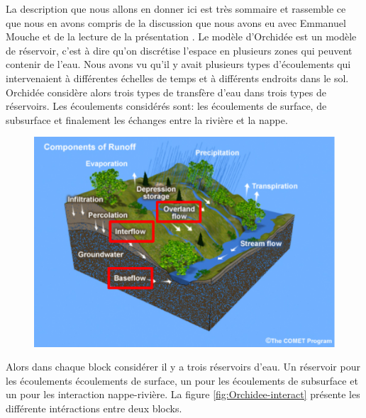 \documentclass[a4paper,11pt]{article}
\numberwithin{equation}{section}
\begin{document}
La description que nous allons en donner ici est très sommaire et rassemble ce que nous en avons compris de la discussion que nous avons eu avec Emmanuel Mouche et de la lecture de la présentation \cite{gumiberteau2016}. Le modèle d'Orchidée est un modèle de réservoir, c'est à dire qu'on discrétise l'espace en plusieurs zones qui peuvent contenir de l'eau. Nous avons vu qu'il y avait plusieurs types d'écoulements qui intervenaient à différentes échelles de temps et à différents endroits dans le sol. Orchidée considère alors trois types de transfère d'eau dans trois types de réservoirs. Les écoulements considérés sont: les écoulements de surface, de subsurface et finalement les échanges entre la rivière et la nappe. 

\begin{figure}[h]
	\label{fig:HGS}
	\begin{center}
		\includegraphics[scale=0.3]{different_flows.png}
	\end{center}
\end{figure}

Alors dans chaque block considérer il y a trois réservoirs d'eau. Un réservoir pour les écoulements écoulements de surface, un pour les écoulements de subsurface et un pour les interaction nappe-rivière. La figure \ref{fig:Orchidee-interact} présente les différente intéractions entre deux blocks.
\end{document}
